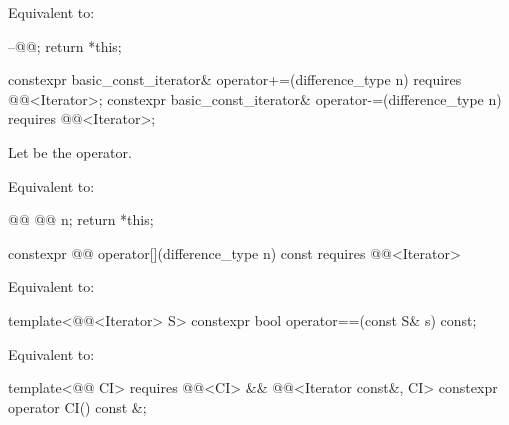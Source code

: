 \begin{itemdescr}
\pnum
\effects
Equivalent to:
\begin{codeblock}
--@@;
return *this;
\end{codeblock}
\end{itemdescr}

%
%
\begin{itemdecl}
constexpr basic_const_iterator& operator+=(difference_type n)
  requires @@<Iterator>;
constexpr basic_const_iterator& operator-=(difference_type n)
  requires @@<Iterator>;
\end{itemdecl}

\begin{itemdescr}
\pnum
Let  be the operator.

\pnum
\effects
Equivalent to:
\begin{codeblock}
@@ @@ n;
return *this;
\end{codeblock}
\end{itemdescr}

%
\begin{itemdecl}
constexpr @@ operator[](difference_type n) const requires @@<Iterator>
\end{itemdecl}

\begin{itemdescr}
\pnum
\effects
Equivalent to: 
\end{itemdescr}

%
\begin{itemdecl}
template<@@<Iterator> S>
  constexpr bool operator==(const S& s) const;
\end{itemdecl}

\begin{itemdescr}
\pnum
\effects
Equivalent to: 
\end{itemdescr}

\begin{itemdecl}
template<@@ CI>
  requires @@<CI> && @@<Iterator const&, CI>
constexpr operator CI() const &;
\end{itemdecl}

